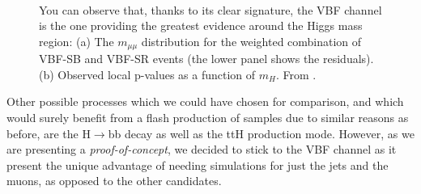 \begin{figure}
    \myfloatalign
     \quad
     \\
    \caption[H$\rightarrow\mu^+\mu^-$]{You can observe that, thanks to its clear signature, the VBF channel is the one providing the greatest evidence around the Higgs mass region: (a) The $m_{\mu\mu}$ distribution for the weighted combination of VBF-SB and VBF-SR events (the lower panel shows the residuals). (b) Observed local p-values as a function of $m_H$. From \cite{Sirunyan_2021}.}\label{fig:vbfmm}
    
\end{figure}

Other possible processes which we could have chosen for comparison, and which would surely benefit from a flash production of samples due to similar reasons as before, are the H$\rightarrow$bb decay as well as the ttH production mode. However, as we are presenting a \emph{proof-of-concept}, we decided to stick to the VBF channel as it present the unique advantage of needing simulations for just the jets and the muons, as opposed to the other candidates. 